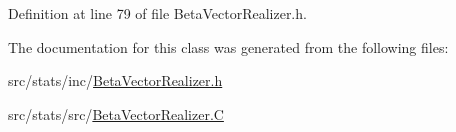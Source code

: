 Definition at line 79 of file Beta\-Vector\-Realizer.\-h.



The documentation for this class was generated from the following files\-:\begin{DoxyCompactItemize}
\item 
src/stats/inc/\hyperlink{_beta_vector_realizer_8h}{Beta\-Vector\-Realizer.\-h}\item 
src/stats/src/\hyperlink{_beta_vector_realizer_8_c}{Beta\-Vector\-Realizer.\-C}\end{DoxyCompactItemize}
